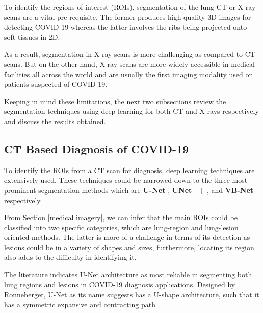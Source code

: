 To identify the regions of interest (ROIs), segmentation of the 
lung CT or X-ray scans are a vital pre-requisite. The former produces 
high-quality 3D images for detecting COVID-19 whereas the latter involves 
the ribs being projected onto soft-tissues in 2D. 

As a result, segmentation 
in X-ray scans is more challenging as compared to CT scans. But on the other hand, 
X-ray scans are more widely accessible in medical facilities all across the world 
and are usually the first imaging modality used on patients suspected of COVID-19.

Keeping in mind these limitations, the next two subsections review the segmentation techniques using deep learning for both CT and X-rays respectively and 
discuss the results obtained.

\subsection{CT Based Diagnosis of COVID-19}
To identify the ROIs from a CT scan for diagnosis, deep learning 
techniques are extensively used. These techniques could be narrowed down 
to the three most prominent segmentation methods which are \textbf{U-Net} \cite{CXZ+2020, CYZ+2020, HLR+2020, YHQ+2020, GOM+2020, LLL+2020}, \textbf{UNet++} \cite{CJL+2020, JSB+2020}, and \textbf{VB-Net}  \cite{SFY+2020} respectively.


From Section \ref{medical imagery}, we can infer that the main ROIs could be classified into 
two specific categories, which are lung-region and lung-lesion oriented 
methods. The latter is more of a challenge in terms of its detection as lesions 
could be in a variety of shapes and sizes, furthermore, locating its region 
also adds to the difficulty in identifying it.

The literature indicates U-Net architecture as most reliable in segmenting both lung regions and lesions in COVID-19 diagnosis 
applications. Designed by Ronneberger, U-Net as its name suggests has a U-shape architecture, 
such that it has a symmetric expansive and contracting path \cite{RFT2015}.

